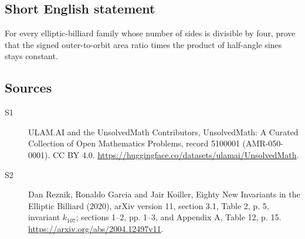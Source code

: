 \documentclass[11pt]{article}
\begin{document}
\subsection{Short English statement}
For every elliptic-billiard family whose number of sides is divisible by four, prove that the signed outer-to-orbit area ratio times the product of half-angle sines stays constant.
\subsection{Sources}
\begin{description}
\item[\hypertarget{source:5100001:1}{S1}] ULAM.AI and the UnsolvedMath Contributors, UnsolvedMath: A Curated Collection of Open Mathematics Problems, record 5100001 (AMR-050-0001). CC BY 4.0. \url{https://huggingface.co/datasets/ulamai/UnsolvedMath}.
\item[\hypertarget{source:5100001:2}{S2}] Dan Reznik, Ronaldo Garcia and Jair Koiller, Eighty New Invariants in the Elliptic Billiard (2020), arXiv version 11, section 3.1, Table 2, p. 5, invariant $k_{107}$; sections 1--2, pp. 1--3, and Appendix A, Table 12, p. 15. \url{https://arxiv.org/abs/2004.12497v11}.
\end{description}
\label{end:5100001}
\end{document}
